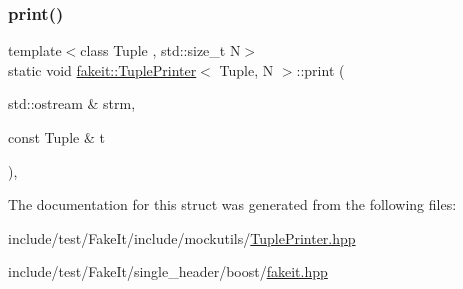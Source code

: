 \subsubsection{\texorpdfstring{print()}{print()}\hspace{0.1cm}{\footnotesize\ttfamily [9/9]}}
{\footnotesize\ttfamily template$<$class Tuple , std\+::size\+\_\+t N$>$ \\
static void \mbox{\hyperlink{structfakeit_1_1TuplePrinter}{fakeit\+::\+Tuple\+Printer}}$<$ Tuple, N $>$\+::print (\begin{DoxyParamCaption}\item[{std\+::ostream \&}]{strm,  }\item[{const Tuple \&}]{t }\end{DoxyParamCaption})\hspace{0.3cm}{\ttfamily [inline]}, {\ttfamily [static]}}



The documentation for this struct was generated from the following files\+:\begin{DoxyCompactItemize}
\item 
include/test/\+Fake\+It/include/mockutils/\mbox{\hyperlink{TuplePrinter_8hpp}{Tuple\+Printer.\+hpp}}\item 
include/test/\+Fake\+It/single\+\_\+header/boost/\mbox{\hyperlink{single__header_2boost_2fakeit_8hpp}{fakeit.\+hpp}}\end{DoxyCompactItemize}
